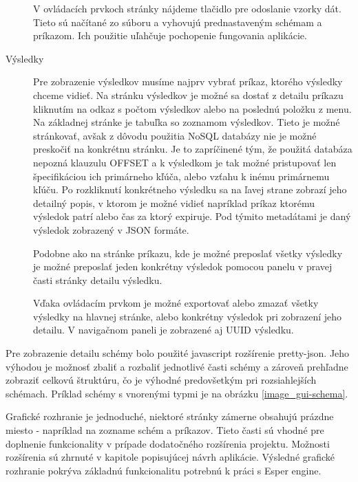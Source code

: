 \begin{description}
		V ovládacích prvkoch stránky nájdeme tlačidlo pre odoslanie vzorky dát. Tieto sú načítané zo súboru a vyhovujú prednastaveným schémam a príkazom. Ich použitie uľahčuje pochopenie fungovania aplikácie.
		
		\item[Výsledky] Pre zobrazenie výsledkov musíme najprv vybrať príkaz, ktorého výsledky chceme vidieť. Na stránku výsledkov je možné sa dostať z detailu príkazu kliknutím na odkaz s počtom výsledkov alebo na poslednú položku z menu.
		Na základnej stránke je tabuľka so zoznamom výsledkov. Tieto je možné stránkovať, avšak z dôvodu použitia NoSQL databázy nie je možné preskočiť na konkrétnu stránku. Je to zapríčinené tým, že použitá databáza nepozná klauzulu OFFSET a k výsledkom je tak možné pristupovať len špecifikáciou ich primárneho kľúča, alebo vzťahu k inému primárnemu kľúču.
		Po rozkliknutí konkrétneho výsledku sa na ľavej strane zobrazí jeho detailný popis, v ktorom je možné vidieť napríklad príkaz ktorému výsledok patrí alebo čas za ktorý expiruje. Pod týmito metadátami je daný výsledok zobrazený v JSON formáte.
		
		Podobne ako na stránke príkazu, kde je možné preposlať všetky výsledky je možné preposlať jeden konkrétny výsledok pomocou panelu v pravej časti stránky detailu výsledku.

		Vďaka ovládacím prvkom je možné exportovať alebo zmazať všetky výsledky na hlavnej stránke, alebo konkrétny výsledok pri zobrazení jeho detailu. V navigačnom paneli je zobrazené aj UUID výsledku.
	\end{description}
	
	
	Pre zobrazenie detailu schémy bolo použité javascript rozšírenie pretty-json. Jeho výhodou je možnosť zbaliť a rozbaliť jednotlivé časti schémy a zároveň prehľadne zobraziť celkovú štruktúru, čo je výhodné predovšetkým pri rozsiahlejších schémach. Príklad schémy s vnorenými typmi je na obrázku \ref{image_gui-schema}.
	
	Grafické rozhranie je jednoduché, niektoré stránky zámerne obsahujú prázdne miesto - napríklad na zozname schém a príkazov. Tieto časti sú vhodné pre doplnenie funkcionality v prípade dodatočného rozšírenia projektu. Možnosti rozšírenia sú zhrnuté v kapitole popisujúcej návrh aplikácie. Výsledné grafické rozhranie pokrýva základnú funkcionalitu potrebnú k práci s Esper engine.
	